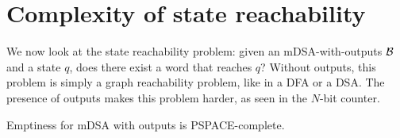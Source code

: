 \section{Complexity of state reachability}
\label{sec:mdsa-with-output-complexity}

We now look at the state reachability problem: given an mDSA-with-outputs $\mathcal{B}$ and a state $q$, does there exist a word that reaches $q$? Without outputs, this problem is simply a graph reachability problem, like in a DFA or a DSA. The presence of outputs makes this problem harder, as seen in the $N$-bit counter.








\begin{theorem}\label{thm:complexity}
Emptiness for mDSA with outputs is PSPACE-complete.
\end{theorem}
